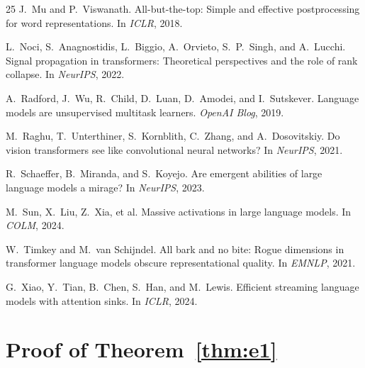 \documentclass[11pt]{article}
\begin{document}
\begin{thebibliography}{25}
J.~Mu and P.~Viswanath.
\newblock All-but-the-top: Simple and effective postprocessing for word representations.
\newblock In \emph{ICLR}, 2018.

L.~Noci, S.~Anagnostidis, L.~Biggio, A.~Orvieto, S.~P.~Singh, and A.~Lucchi.
\newblock Signal propagation in transformers: Theoretical perspectives and the role of rank collapse.
\newblock In \emph{NeurIPS}, 2022.

A.~Radford, J.~Wu, R.~Child, D.~Luan, D.~Amodei, and I.~Sutskever.
\newblock Language models are unsupervised multitask learners.
\newblock \emph{OpenAI Blog}, 2019.

M.~Raghu, T.~Unterthiner, S.~Kornblith, C.~Zhang, and A.~Dosovitskiy.
\newblock Do vision transformers see like convolutional neural networks?
\newblock In \emph{NeurIPS}, 2021.

R.~Schaeffer, B.~Miranda, and S.~Koyejo.
\newblock Are emergent abilities of large language models a mirage?
\newblock In \emph{NeurIPS}, 2023.

M.~Sun, X.~Liu, Z.~Xia, et al.
\newblock Massive activations in large language models.
\newblock In \emph{COLM}, 2024.

W.~Timkey and M.~van Schijndel.
\newblock All bark and no bite: Rogue dimensions in transformer language models obscure representational quality.
\newblock In \emph{EMNLP}, 2021.

G.~Xiao, Y.~Tian, B.~Chen, S.~Han, and M.~Lewis.
\newblock Efficient streaming language models with attention sinks.
\newblock In \emph{ICLR}, 2024.

\end{thebibliography}

\newpage
\appendix

\section{Proof of Theorem~\ref{thm:e1}}\label{app:proof}
\end{document}
